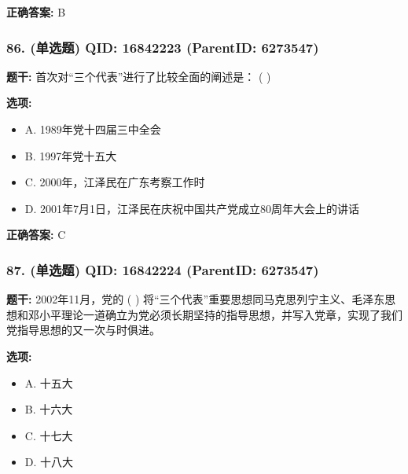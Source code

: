 \documentclass[12pt,UTF8]{ctexart}
\begin{document}
\textbf{正确答案:}
B

\vspace{0.3em}\hrulefill\vspace{0.7em}

\subsubsection*{86. (单选题) \small QID: 16842223 (ParentID: 6273547)}

\textbf{题干:}
首次对“三个代表”进行了比较全面的阐述是： ( )



\textbf{选项:}
\begin{itemize}[leftmargin=*]

  \item A. 1989年党十四届三中全会

  \item B. 1997年党十五大

  \item C. 2000年，江泽民在广东考察工作时

  \item D. 2001年7月1日，江泽民在庆祝中国共产党成立80周年大会上的讲话

\end{itemize}

\textbf{正确答案:}
C

\vspace{0.3em}\hrulefill\vspace{0.7em}

\subsubsection*{87. (单选题) \small QID: 16842224 (ParentID: 6273547)}

\textbf{题干:}
2002年11月，党的 ( ) 将“三个代表”重要思想同马克思列宁主义、毛泽东思想和邓小平理论一道确立为党必须长期坚持的指导思想，并写入党章，实现了我们党指导思想的又一次与时俱进。



\textbf{选项:}
\begin{itemize}[leftmargin=*]

  \item A. 十五大

  \item B. 十六大

  \item C. 十七大

  \item D. 十八大

\end{itemize}
\end{document}
